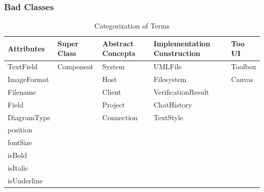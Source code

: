 \documentclass[12pt]{article}
\begin{document}
    \newpage

    \subsubsection{Bad Classes}

    \begin{table}[h]
        \centering
        \caption{Categorization of Terms}
        \begin{tabular}{l l l ll}
            \toprule
            \textbf{Attributes} & \textbf{Super Class} & \textbf{Abstract Concepts} & \textbf{Implementation Construction}  & \textbf{Too UI}\\
            \midrule
            TextField           & Component            & System                     & UMLFile                              & Toolbox         \\
            ImageFormat         &                      & Host                       & Filesystem                           & Canvas          \\
            Filename            &                      & Client                     & VerificationResult                   &                 \\
            Field               &                      & Project                    & ChatHistory                          &                 \\
            DiagramType         &                      & Connection                 & TextStyle                            &                 \\
            position            &                      &                            &                                      &                 \\
            fontSize            &                      &                            &                                      &                 \\
            isBold              &                      &                            &                                      &                 \\
            isItalic            &                      &                            &                                      &                 \\
            isUnderline         &                      &                            &                                      &                 \\
            \bottomrule
        \end{tabular}
        \label{tab:categories}
    \end{table}
\end{document}
